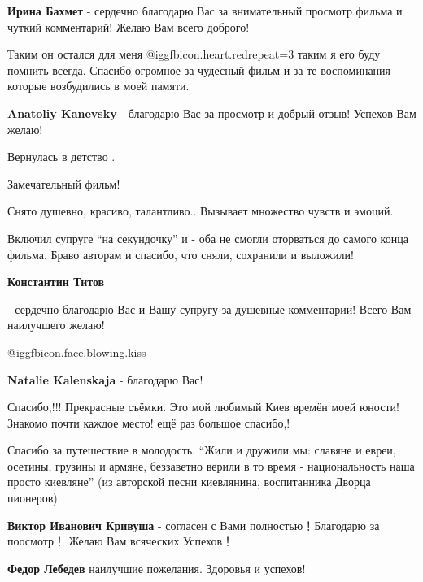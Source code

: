 \begin{itemize}
\textbf{Ирина Бахмет} - сердечно благодарю Вас за внимательный просмотр фильма и чуткий комментарий! Желаю Вам всего доброго!


Таким он остался для меня @igg{fbicon.heart.red}{repeat=3} таким я его буду
помнить всегда. Спасибо огромное за чудесный фильм и за те воспоминания которые
возбудились в моей памяти.

\textbf{Anatoliy Kanevsky} - благодарю Вас за просмотр и добрый отзыв! Успехов Вам желаю!

Вернулась в детство .


Замечательный фильм!

Снято душевно, красиво, талантливо.. Вызывает множество чувств и эмоций.

Включил супруге \enquote{на секундочку} и - оба не смогли оторваться до самого конца
фильма. Браво авторам и спасибо, что сняли, сохранили и выложили!


\textbf{Константин Титов} 

- сердечно благодарю Вас и Вашу супругу за душевные комментарии! Всего Вам
наилучшего желаю!

 @igg{fbicon.face.blowing.kiss} 

\textbf{Natalie Kalenskaja} - благодарю Вас!


Спасибо,!!! Прекрасные съёмки. Это мой любимый Киев времён моей юности!
Знакомо почти каждое место! ещё раз большое спасибо,!


Спасибо за путешествие в молодость. \enquote{Жили и дружили мы: славяне и евреи,
осетины, грузины и армяне, беззаветно верили в то время - национальность наша
просто киевляне} (из авторской песни киевлянина, воспитанника Дворца пионеров)

\begin{itemize} %
\textbf{Виктор Иванович Кривуша} - согласен с Вами полностью！Благодарю за поосмотр！ Желаю Вам всяческих Успехов！

\textbf{Федор Лебедев} наилучшие пожелания. Здоровья и успехов!
\end{itemize} %



\end{itemize}
